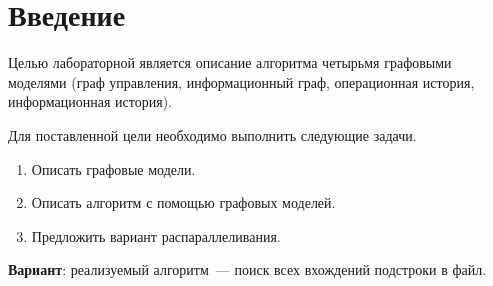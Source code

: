 \chapter*{Введение}

Целью лабораторной является описание алгоритма четырьмя графовыми моделями (граф управления, информационный граф, операционная история, информационная история).

Для поставленной цели необходимо выполнить следующие задачи.
\begin{enumerate}
	\item Описать графовые модели.
	\item Описать алгоритм с помощью графовых моделей.
	\item Предложить вариант распараллеливания.
\end{enumerate}

\textbf{Вариант}: реализуемый алгоритм~--- поиск всех вхождений подстроки в файл.
